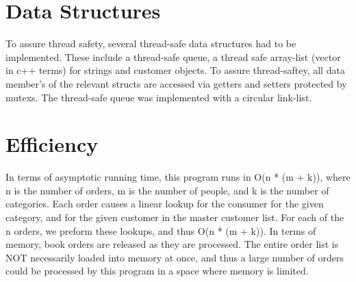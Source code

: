 \documentclass[]{article}
\begin{document}
\section{Data Structures}
\par 
To assure thread safety, several thread-safe data structures had to be implemented. These include a thread-safe queue, a thread safe array-list (vector in c++ terms) for strings and customer objects. To assure thread-saftey, all data member's of the relevant structs are accessed via getters and setters protected by mutexs. The thread-safe queue was implemented with a circular link-list. \par  

\section{Efficiency}
\par 
In terms of asymptotic running time, this program runs in O(n * (m + k)), where n is the number of orders, m is the number of people, and k is the number of categories. Each order causes a linear lookup for the consumer for the given category, and for the given customer in the master customer list. For each of the n orders, we preform these lookups, and thus O(n * (m + k)). In terms of memory, book orders are released as they are processed. The entire order list is NOT necessarily loaded into memory at once, and thus a large number of orders could be processed by this program in a space where memory is limited.      
\end{document}
